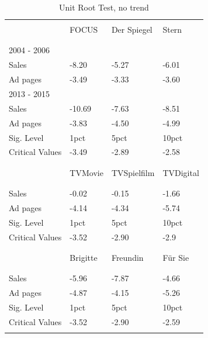 \documentclass[12pt,a4paper,notitlepage]{article}
\begin{document}
\begin{appendices}
\begin{table}[!htbp]\centering 
  \caption{Unit Root Test, no trend} 
  \label{tab_uroot} 
\begin{tabular}{@{\extracolsep{5pt}} llll} 
\\[-1.8ex]\hline 
\hline \\[-1.8ex] 
 & FOCUS & Der Spiegel & Stern \\ 
\\[-1.8ex]\hline 
\hline \\[-1.8ex] 
2004 - 2006 \\
\hline
Sales & -8.20 & -5.27 & -6.01 \\ 
Ad pages & -3.49 & -3.33 & -3.60 \\ 
\hline
2013 - 2015 \\
\hline
Sales & -10.69 & -7.63 & -8.51 \\ 
Ad pages & -3.83 & -4.50 & -4.99 \\ 
\hline
Sig. Level & 1pct & 5pct & 10pct \\ 
Critical Values & -3.49 & -2.89 & -2.58 \\ 
\\[-1.8ex]\hline 
\hline \\[-1.8ex] 
 & TVMovie & TVSpielfilm & TVDigital \\ 
\\[-1.8ex]\hline 
\hline \\[-1.8ex] 
Sales & -0.02 & -0.15 & -1.66 \\ 
Ad pages & -4.14 & -4.34 & -5.74 \\
\hline 
Sig. Level & 1pct & 5pct & 10pct \\ 
Critical Values & -3.52 & -2.90 & -2.9 \\ 
\\[-1.8ex]\hline 
\hline \\[-1.8ex] 
 & Brigitte & Freundin & Für Sie \\ 
\\[-1.8ex]\hline 
\hline \\[-1.8ex] 
Sales & -5.96 & -7.87 & -4.66 \\ 
Ad pages & -4.87 & -4.15 & -5.26 \\ 
\hline
Sig. Level & 1pct & 5pct & 10pct \\ 
Critical Values & -3.52 & -2.90 & -2.59 \\ 
\hline \\[-1.8ex] 
\end{tabular} 
\end{table} 

\end{appendices}
\end{document}
